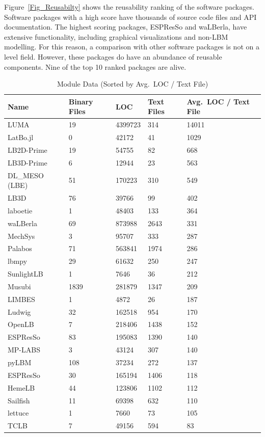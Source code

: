 \documentclass[final, 3p, times, authoryear]{elsarticle}
\newcommand{\esp}{ESPResSo\nolinebreak\hspace{-.05em}\raisebox{.4ex}{\small\bf
+}\nolinebreak\hspace{-.10em}\raisebox{.4ex}{\small\bf +}}
\begin{document}
Figure~\ref{Fig_Reusabilty} shows the reusability ranking of the software
packages. Software packages with a high score have thousands of source code
files and API documentation. The highest scoring packages, ESPResSo and
waLBerla, have extensive functionality, including graphical visualizations and
non-LBM modelling. For this reason, a comparison with other software packages is
not on a level field. However, these packages do have an abundance of reusable
components. Nine of the top 10 ranked packages are alive.

\begin{table}[ht!]
	\begin{center}
		\begin{tabular}{ p{3cm}p{2cm}p{2cm}p{2cm}p{3cm} }
			\toprule
			Name & Binary Files & LOC & Text Files & Avg.\ LOC / Text File \\
			\midrule
			LUMA & 19 & 4399723 & 314 & 14011 \\
			LatBo.jl & 0 & 42172 & 41& 1029 \\
			LB2D-Prime & 19 & 54755 & 82& 668 \\
			LB3D-Prime & 6 & 12944 & 23& 563 \\
			DL\_MESO (LBE) & 51 & 170223 & 310 & 549 \\
			LB3D & 76 & 39766 & 99 & 402 \\
			laboetie & 1 & 48403 & 133& 364 \\
			waLBerla & 69 & 873988 & 2643 & 331 \\
			MechSys & 3 & 95707 & 333 & 287 \\
			Palabos & 71 & 563841 & 1974 & 286 \\
			lbmpy & 29 & 61632 & 250 & 247 \\
			SunlightLB & 1 & 7646 & 36 & 212 \\
			Musubi & 1839 & 281879 & 1347 & 209 \\
			LIMBES & 1 & 4872 & 26 & 187 \\
			Ludwig & 32 & 162518 & 954 & 170 \\
			OpenLB & 7 & 218406 & 1438 & 152 \\
			ESPResSo & 83 & 195083 & 1390& 140 \\
			MP-LABS & 3 & 43124 & 307 & 140 \\
			pyLBM & 108 & 37234 & 272 & 137 \\
			\esp & 30 & 165194 & 1406& 118 \\
			HemeLB & 44 & 123806 & 1102& 112 \\
			Sailfish & 11 & 69398 & 632 & 110 \\
			lettuce & 1 & 7660 & 73 & 105 \\
			TCLB & 7 & 49156 & 594 & 83 \\
			\bottomrule
		\end{tabular}
		\caption{Module Data (Sorted by Avg.\ LOC / Text File)} \label{moduledata}
	\end{center}
\end{table}
\end{document}
